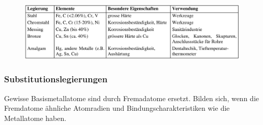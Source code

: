 \begin{figure}[htbp]
	\centering
	\includegraphics[width=1\linewidth]{images/3_Legierungen.png}
\end{figure}

\subsubsection{Substitutionslegierungen}
Gewisse Basismetallatome sind durch Fremadatome ersetzt. Bilden sich, wenn die Fremdatome ähnliche Atomradien und Bindungscharakteristiken wie die Metallatome haben.

